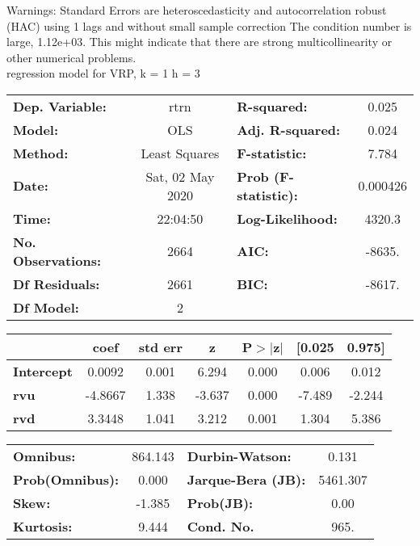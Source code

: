 Warnings: \newline
 [1] Standard Errors are heteroscedasticity and autocorrelation robust (HAC) using 1 lags and without small sample correction \newline
 [2] The condition number is large, 1.12e+03. This might indicate that there are \newline
 strong multicollinearity or other numerical problems.\\ 

regression model for VRP, k = 1 h = 3\begin{center}
\begin{tabular}{lclc}
\toprule
\textbf{Dep. Variable:}    &       rtrn       & \textbf{  R-squared:         } &     0.025   \\
\textbf{Model:}            &       OLS        & \textbf{  Adj. R-squared:    } &     0.024   \\
\textbf{Method:}           &  Least Squares   & \textbf{  F-statistic:       } &     7.784   \\
\textbf{Date:}             & Sat, 02 May 2020 & \textbf{  Prob (F-statistic):} &  0.000426   \\
\textbf{Time:}             &     22:04:50     & \textbf{  Log-Likelihood:    } &    4320.3   \\
\textbf{No. Observations:} &        2664      & \textbf{  AIC:               } &    -8635.   \\
\textbf{Df Residuals:}     &        2661      & \textbf{  BIC:               } &    -8617.   \\
\textbf{Df Model:}         &           2      & \textbf{                     } &             \\
\bottomrule
\end{tabular}
\begin{tabular}{lcccccc}
                   & \textbf{coef} & \textbf{std err} & \textbf{z} & \textbf{P$> |$z$|$} & \textbf{[0.025} & \textbf{0.975]}  \\
\midrule
\textbf{Intercept} &       0.0092  &        0.001     &     6.294  &         0.000        &        0.006    &        0.012     \\
\textbf{rvu}       &      -4.8667  &        1.338     &    -3.637  &         0.000        &       -7.489    &       -2.244     \\
\textbf{rvd}       &       3.3448  &        1.041     &     3.212  &         0.001        &        1.304    &        5.386     \\
\bottomrule
\end{tabular}
\begin{tabular}{lclc}
\textbf{Omnibus:}       & 864.143 & \textbf{  Durbin-Watson:     } &    0.131  \\
\textbf{Prob(Omnibus):} &   0.000 & \textbf{  Jarque-Bera (JB):  } & 5461.307  \\
\textbf{Skew:}          &  -1.385 & \textbf{  Prob(JB):          } &     0.00  \\
\textbf{Kurtosis:}      &   9.444 & \textbf{  Cond. No.          } &     965.  \\
\bottomrule
\end{tabular}
\end{center}

